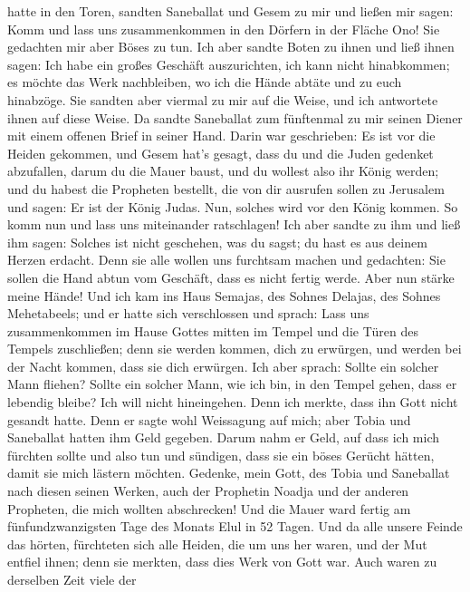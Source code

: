 hatte in den Toren,  sandten Saneballat und Gesem zu mir und
ließen mir sagen: Komm und lass uns zusammenkommen in den Dörfern in der
Fläche Ono! Sie gedachten mir aber Böses zu tun.  Ich aber
sandte Boten zu ihnen und ließ ihnen sagen: Ich habe ein großes Geschäft
auszurichten, ich kann nicht hinabkommen; es möchte das Werk
nachbleiben, wo ich die Hände abtäte und zu euch hinabzöge. 
Sie sandten aber viermal zu mir auf die Weise, und ich antwortete ihnen
auf diese Weise.  Da sandte Saneballat zum fünftenmal zu mir
seinen Diener mit einem offenen Brief in seiner Hand.  Darin
war geschrieben: Es ist vor die Heiden gekommen, und Gesem hat's gesagt,
dass du und die Juden gedenket abzufallen, darum du die Mauer baust, und
du wollest also ihr König werden;  und du habest die
Propheten bestellt, die von dir ausrufen sollen zu Jerusalem und sagen:
Er ist der König Judas. Nun, solches wird vor den König kommen. So komm
nun und lass uns miteinander ratschlagen!  Ich aber sandte
zu ihm und ließ ihm sagen: Solches ist nicht geschehen, was du sagst; du
hast es aus deinem Herzen erdacht.  Denn sie alle wollen uns
furchtsam machen und gedachten: Sie sollen die Hand abtun vom Geschäft,
dass es nicht fertig werde. Aber nun stärke meine Hände! 
Und ich kam ins Haus Semajas, des Sohnes Delajas, des Sohnes
Mehetabeels; und er hatte sich verschlossen und sprach: Lass uns
zusammenkommen im Hause Gottes mitten im Tempel und die Türen des
Tempels zuschließen; denn sie werden kommen, dich zu erwürgen, und
werden bei der Nacht kommen, dass sie dich erwürgen.  Ich
aber sprach: Sollte ein solcher Mann fliehen? Sollte ein solcher Mann,
wie ich bin, in den Tempel gehen, dass er lebendig bleibe? Ich will
nicht hineingehen.  Denn ich merkte, dass ihn Gott nicht
gesandt hatte. Denn er sagte wohl Weissagung auf mich; aber Tobia und
Saneballat hatten ihm Geld gegeben.  Darum nahm er Geld,
auf dass ich mich fürchten sollte und also tun und sündigen, dass sie
ein böses Gerücht hätten, damit sie mich lästern möchten. 
Gedenke, mein Gott, des Tobia und Saneballat nach diesen seinen Werken,
auch der Prophetin Noadja und der anderen Propheten, die mich wollten
abschrecken!  Und die Mauer ward fertig am
fünfundzwanzigsten Tage des Monats Elul in 52 Tagen.  Und
da alle unsere Feinde das hörten, fürchteten sich alle Heiden, die um
uns her waren, und der Mut entfiel ihnen; denn sie merkten, dass dies
Werk von Gott war.  Auch waren zu derselben Zeit viele der
